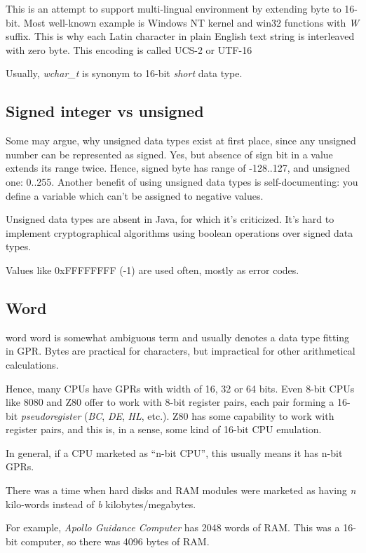 This is an attempt to support multi-lingual environment by extending byte to 16-bit.
Most well-known example is Windows NT kernel and win32 functions with \emph{W} suffix.
This is why each Latin character in plain English text string is interleaved with zero byte.
This encoding is called UCS-2 or UTF-16

Usually, \emph{wchar\_t} is synonym to 16-bit \emph{short} data type.

\subsection{Signed integer vs unsigned}

Some may argue, why unsigned data types exist at first place, since any unsigned number can be represented as signed.
Yes, but absence of sign bit in a value extends its range twice.
Hence, signed byte has range of -128..127, and unsigned one: 0..255.
Another benefit of using unsigned data types is self-documenting:
you define a variable which can't be assigned to negative values.

Unsigned data types are absent in Java, for which it's criticized.
It's hard to implement cryptographical algorithms using boolean operations over signed data types.

Values like 0xFFFFFFFF (-1) are used often, mostly as error codes.

\subsection{Word}

\Gls{word} word is somewhat ambiguous term and usually denotes a data type fitting in \ac{GPR}.
Bytes are practical for characters, but impractical for other arithmetical calculations.

Hence, many \ac{CPU}s have \ac{GPR}s with width of 16, 32 or 64 bits.
Even 8-bit CPUs like 8080 and Z80 offer to work with 8-bit register pairs, each pair forming a 16-bit \emph{pseudoregister}
(\emph{BC}, \emph{DE}, \emph{HL}, etc.).
Z80 has some capability to work with register pairs, and this is, in a sense, some kind of 16-bit CPU emulation.

In general, if a CPU marketed as ``n-bit CPU'', this usually means it has n-bit \ac{GPR}s.

There was a time when hard disks and \ac{RAM} modules were marketed as having \emph{n} kilo-words instead of
\emph{b} kilobytes/megabytes.

For example, \emph{Apollo Guidance Computer}
has 2048 words of \ac{RAM}.
This was a 16-bit computer, so there was 4096 bytes of \ac{RAM}.

